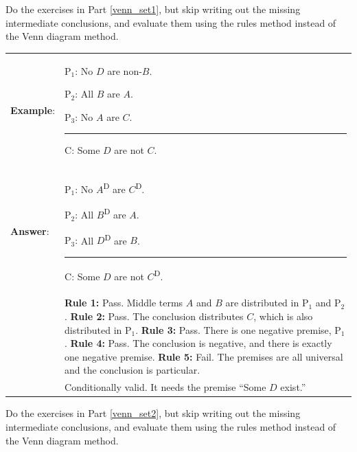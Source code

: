 \noindent\problempart Do the exercises in Part \ref{venn_set1}, but skip writing out the missing intermediate conclusions, and evaluate them using the rules method instead of the Venn diagram method.

\begin{longtabu}{p{.1\linewidth}p{.9\linewidth}}

\textbf{Example}: & \vspace{-16pt} \begin{earg} 
\item[P$_1$:] No $D$ are non-$B$.
\item[P$_2$:] All $B$ are $A$. 
\item[P$_3$:] No $A$ are $C$. 
\vspace{-.5em} 
\item [] \rule{0.3\linewidth}{.5pt} 
\item[C:] Some $D$ are not $C$. 
\end{earg} \\
\textbf{Answer}: & \vspace{-16pt} \begin{earg} 
\item[P$_1$:] No $A$\textsuperscript{D} are $C$\textsuperscript{D}.
\item[P$_2$:] All $B$\textsuperscript{D} are $A$. %
\item[P$_3$:] All $D$\textsuperscript{D} are $B$.
\vspace{-.5em} 
\item [] \rule{0.3\linewidth}{.5pt} 
\item[C:] Some $D$ are not $C$\textsuperscript{D}. 
\end{earg}
\\ & 
\textbf{Rule 1:} Pass. Middle terms $A$ and $B$ are distributed in P$_1$ and P$_2$. \newline
\textbf{Rule 2:} Pass. The conclusion distributes $C$, which is also distributed in  P$_1$.\newline
\textbf{Rule 3:} Pass. There is one negative premise, P$_1$. \newline
\textbf{Rule 4:} Pass. The conclusion is negative, and there is exactly one negative premise.\newline
\textbf{Rule 5:} Fail. The premises are all universal and the conclusion is particular. \\
& Conditionally valid. It needs the premise ``Some $D$ exist.''
\end{longtabu}


\noindent\problempart Do the exercises in Part \ref{venn_set2}, but skip writing out the missing intermediate conclusions, and evaluate them using the rules method instead of the Venn diagram method.


